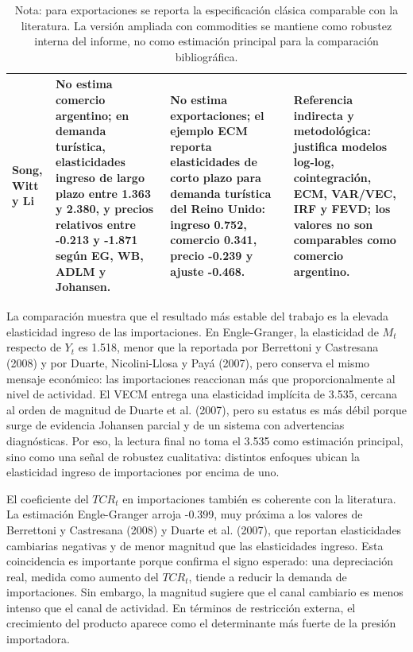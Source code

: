 \documentclass[11pt,a4paper]{article}
\begin{document}
\begin{table}[H]
\begin{tabular}{p{2.8cm}p{3.2cm}p{3.2cm}p{4.1cm}}
Song, Witt y Li \cite{song_witt_li_2008} & No estima comercio argentino; en demanda turística, elasticidades ingreso de largo plazo entre 1.363 y 2.380, y precios relativos entre -0.213 y -1.871 según EG, WB, ADLM y Johansen. & No estima exportaciones; el ejemplo ECM reporta elasticidades de corto plazo para demanda turística del Reino Unido: ingreso 0.752, comercio 0.341, precio -0.239 y ajuste -0.468. & Referencia indirecta y metodológica: justifica modelos log-log, cointegración, ECM, VAR/VEC, IRF y FEVD; los valores no son comparables como comercio argentino. \\
\bottomrule
\end{tabular}
\caption*{\footnotesize Nota: para exportaciones se reporta la especificación
clásica comparable con la literatura. La versión ampliada con commodities se
mantiene como robustez interna del informe, no como estimación principal para la
comparación bibliográfica.}
\end{table}
	
	La comparación muestra que el resultado más estable del trabajo es la elevada
	elasticidad ingreso de las importaciones. En Engle-Granger, la elasticidad de
	\(M_t\) respecto de \(Y_t\) es 1.518, menor que la reportada por Berrettoni y
	Castresana (2008) y por Duarte, Nicolini-Llosa y Payá (2007), pero conserva el
	mismo mensaje económico: las importaciones reaccionan más que
	proporcionalmente al nivel de actividad. El VECM entrega una elasticidad
	implícita de 3.535, cercana al orden de magnitud de Duarte et al. (2007), pero
	su estatus es más débil porque surge de evidencia Johansen parcial y de un
	sistema con advertencias diagnósticas. Por eso, la lectura final no toma el
	3.535 como estimación principal, sino como una señal de robustez cualitativa:
	distintos enfoques ubican la elasticidad ingreso de importaciones por encima de
	uno.
	
	El coeficiente del \(TCR_t\) en importaciones también es coherente con la
	literatura. La estimación Engle-Granger arroja -0.399, muy próxima a los valores
	de Berrettoni y Castresana (2008) y Duarte et al. (2007), que reportan
	elasticidades cambiarias negativas y de menor magnitud que las elasticidades
	ingreso. Esta coincidencia es importante porque confirma el signo esperado:
	una depreciación real, medida como aumento del \(TCR_t\), tiende a reducir la
	demanda de importaciones. Sin embargo, la magnitud sugiere que el canal
	cambiario es menos intenso que el canal de actividad. En términos de
	restricción externa, el crecimiento del producto aparece como el determinante
	más fuerte de la presión importadora.
	
\end{document}
